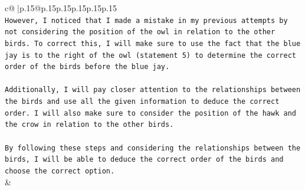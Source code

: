 \documentclass{article}
\begin{document}
{\begin{supertabular}{c@{$\;$}|p{.15\linewidth}@{}p{.15\linewidth}p{.15\linewidth}p{.15\linewidth}p{.15\linewidth}p{.15\linewidth}}
{{{\\ 
\texttt{However, I noticed that I made a mistake in my previous attempts by not considering the position of the owl in relation to the other birds. To correct this, I will make sure to use the fact that the blue jay is to the right of the owl (statement 5) to determine the correct order of the birds before the blue jay.} \\
\\ 
\texttt{Additionally, I will pay closer attention to the relationships between the birds and use all the given information to deduce the correct order. I will also make sure to consider the position of the hawk and the crow in relation to the other birds.} \\
\\ 
\texttt{By following these steps and considering the relationships between the birds, I will be able to deduce the correct order of the birds and choose the correct option.} \\
            }
        }
    }
    & \\ \\

\end{supertabular}
}
\end{document}
